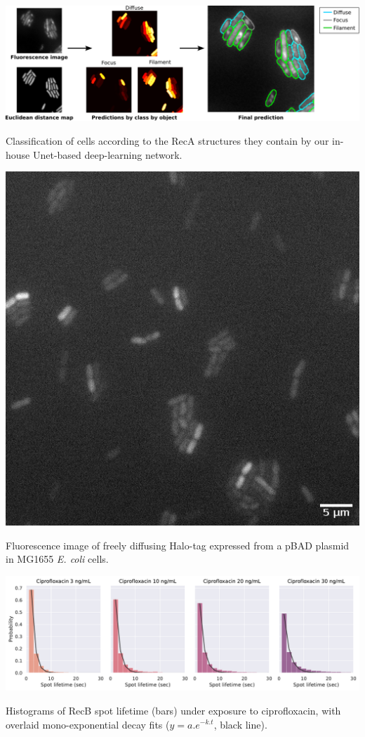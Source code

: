 
\begin{suppfigure*}[htbp]
    \begin{center}
    \includegraphics[width=\textwidth]{SI_Figures/ObjectClassifier.pdf}
    \end{center}
    \caption{Classification of cells according to the RecA structures they contain by our in-house Unet-based deep-learning network.}
    \label{SIFig:object_class}
\end{suppfigure*}

\begin{suppfigure*}[htbp]
\begin{center}
\includegraphics[width=.5\linewidth]{SI_Figures/Free_Halo_image.png}
\end{center}
\caption{Fluorescence image of freely diffusing Halo-tag expressed from a pBAD plasmid in MG1655 \textit{E. coli} cells.}
\label{SIFig:freehalo_image}
\end{suppfigure*}

\begin{suppfigure*}[htbp]
\begin{center}
\includegraphics[width=\linewidth]{SI_Figures/Monoexp_fits_cipro.pdf}
\end{center}
\caption{Histograms of RecB spot lifetime (bars) under exposure to ciprofloxacin, with overlaid mono-exponential decay fits ($y=a.e^{-k.t}$, black line).}
\label{SIFig:monoexp_fits}
\end{suppfigure*}

